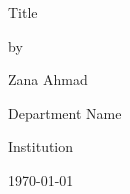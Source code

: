 
\pagestyle{empty}

\begin{center}

\vspace*{8em}

\huge {Title}

\vfill

\large {by}

\vspace{1pt}

\large {Zana Ahmad}

\vfill

\large {Department Name}

\large{Institution}

\vfill

\vspace{1pt}

\today

\vspace*{5em}
    
\end{center}

